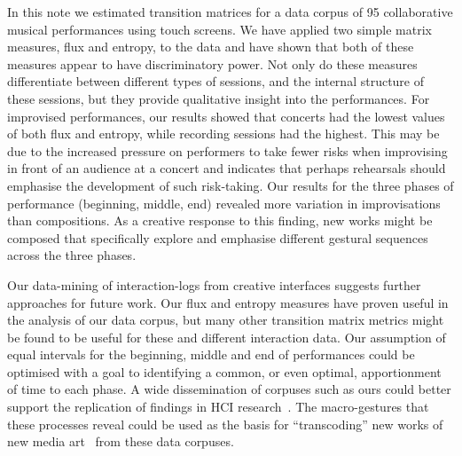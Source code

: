 \documentclass{sigchi}
\begin{document}
In this note we estimated transition matrices 
for a data corpus of 95 collaborative musical performances using touch screens.
We have applied two simple matrix
measures, flux and entropy, to the data and have shown that
 both of these measures appear to 
have discriminatory power. Not only do these measures
differentiate between different types of sessions, and the internal
structure of these sessions, but they provide qualitative insight into the
performances. For improvised performances, our results showed that concerts
had the lowest values of both flux and entropy, while recording sessions had
the highest. This may be due to the increased pressure on performers to take fewer risks
when improvising in front of an audience at a concert and indicates that perhaps rehearsals should 
emphasise the development of such risk-taking. 
Our results for the three phases of performance (beginning, middle, end)
revealed more variation in
improvisations than compositions. As a creative
 response to this finding, 
new works might be
composed that specifically explore and emphasise different gestural sequences across the three phases.

Our data-mining of interaction-logs from creative interfaces suggests
further approaches for future work.
Our flux and entropy measures have proven useful
in the analysis of our data corpus, but many other transition matrix
metrics might be found to be useful for these and different interaction data.
Our assumption of equal intervals for the beginning, middle and end of performances could be 
optimised with a goal to identifying a common, or even optimal, apportionment of time to each phase.  
A wide dissemination of corpuses such as ours could better support the replication of findings in HCI
research~\cite{Wilson:2011ve}. The macro-gestures that these
processes reveal could be used as the basis for ``transcoding'' new works of new media
art~\cite{Manovich:2002ly} from these data corpuses. 



\pagebreak


\end{document}

